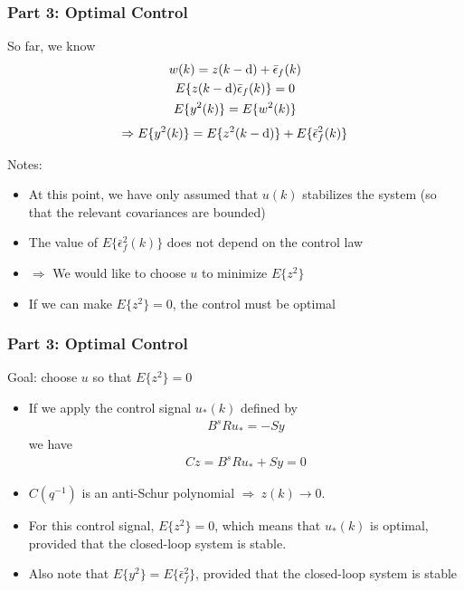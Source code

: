 \begin{frame}
    \frametitle{Part 3: Optimal Control}

    So far, we know
    \vspace{-\baselineskip}
    \begin{gather*}
        w(k) = z(k-\textrm{d}) + \bar{\epsilon}_f(k) \\
        E\{z(k-\textrm{d})\bar{\epsilon}_f(k)\} = 0 \\
        E\{y^2(k)\} = E\{w^2(k)\}
    \end{gather*}
    \paused
    \begin{align*}
        \Rightarrow E\{y^2(k)\} = E\{z^2(k-\textrm{d})\} + E\{\bar{\epsilon}_f^2(k)\}
    \end{align*}
    \paused

    Notes:
    \begin{itemize}
        \item
        At this point, we have only assumed that $u(k)$ stabilizes the system (so that the relevant covariances are bounded)
        \pause

        \item
        The value of $E\{\bar{\epsilon}_f^2(k)\}$ does not depend on the control law
        \pause

        \item
        $\Rightarrow$ We would like to choose $u$ to minimize $E\{z^2\}$
        \pause

        \item
        If we can make $E\{z^2\} = 0$, the control must be optimal
    \end{itemize}

\end{frame}

\begin{frame}
    \frametitle{Part 3: Optimal Control}

    Goal: choose $u$ so that $E\{z^2\} = 0$
    \pause

    \begin{itemize}
        \item
        If we apply the control signal $u_*(k)$ defined by
        \begin{align*}
            B^s Ru_* = - Sy
        \end{align*}
        \paused
        we have
        \begin{align*}
            Cz = B^s Ru_* + Sy = 0
        \end{align*}
        \paused

        \item
        $C(q^{-1})$ is an anti-Schur polynomial $\Rightarrow \ z(k) \longrightarrow 0$.
        \pause

        \item
        For this control signal, $E\{z^2\} = 0$, which means that $u_*(k)$ is optimal, provided that the closed-loop system is stable.
        \pause

        \item
        Also note that $E\{y^2\} = E\{\bar{\epsilon}_f^2\}$, provided that the closed-loop system is stable
    \end{itemize}
\end{frame}

